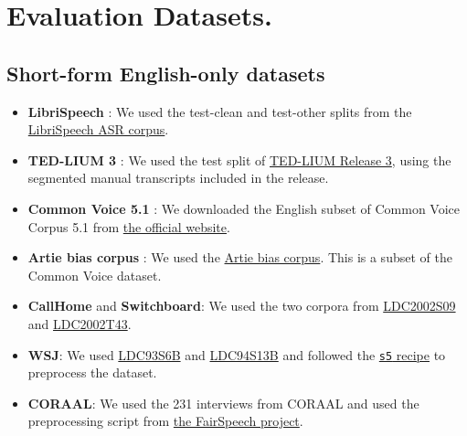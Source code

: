 \documentclass[nohyperref]{article}
\theoremstyle{plain}
\theoremstyle{definition}
\theoremstyle{remark}
\begin{document}
\section{Evaluation Datasets.}\label{sec:datasets}


\subsection{Short-form English-only datasets}


\begin{itemize}
    
\item \textbf{LibriSpeech} \cite{panayotov2015librispeech}: We used the test-clean and test-other splits from the \href{https://www.openslr.org/12}{LibriSpeech ASR corpus}.

\item \textbf{TED-LIUM 3} \cite{Hernandez2018TEDLIUM3T}: We used the test split of \href{https://www.openslr.org/51/}{TED-LIUM Release 3}, using the segmented manual transcripts included in the release.

\item \textbf{Common Voice 5.1} \cite{ardila2019common}: We downloaded the English subset of Common Voice Corpus 5.1 from \href{https://commonvoice.mozilla.org/en/datasets}{the official website}.

\item \textbf{Artie bias corpus} \cite{meyer2020artie}: We used the \href{https://github.com/artie-inc/artie-bias-corpus}{Artie bias corpus}. This is a subset of the Common Voice dataset.

\item \textbf{CallHome} and \textbf{Switchboard}: We used the two corpora from \href{https://catalog.ldc.upenn.edu/LDC2002S09}{LDC2002S09} and \href{https://catalog.ldc.upenn.edu/LDC2002T43}{LDC2002T43}.

\item \textbf{WSJ}: We used \href{https://catalog.ldc.upenn.edu/LDC93S6B}{LDC93S6B} and \href{https://catalog.ldc.upenn.edu/LDC94S13B}{LDC94S13B} and followed the \href{https://github.com/kaldi-asr/kaldi/tree/master/egs/wsj/s5}{\texttt{s5} recipe} to preprocess the dataset.

\item \textbf{CORAAL}: We used the 231 interviews from CORAAL \cite{kendall2021coraal} and used the preprocessing script from \href{https://github.com/stanford-policylab/asr-disparities/blob/master/input/CORAAL_transcripts.csv}{the FairSpeech project}.


\end{itemize}
\end{document}
